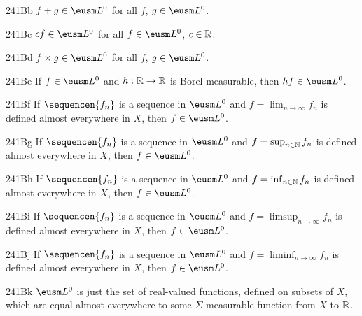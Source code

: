 \spheader 241Bb $f+g\in\eusm L^0$ for all $f$, $g\in\eusm L^0$.

\spheader 241Bc $cf\in\eusm L^0$ for all $f\in\eusm L^0$,
$c\in\Bbb R$.

\spheader 241Bd $f\times g\in\eusm L^0$ for all $f$,
$g\in\eusm L^0$.

\spheader 241Be If $f\in\eusm L^0$ and $h:\Bbb R\to\Bbb R$ is Borel measurable, then
$hf\in\eusm L^0$.

\spheader 241Bf If $\sequencen{f_n}$ is a sequence in $\eusm L^0$ and
$f=\lim_{n\to\infty}f_n$ is defined
almost everywhere in $X$, then $f\in\eusm L^0$.

\spheader 241Bg If $\sequencen{f_n}$ is a sequence in $\eusm L^0$ and
$f=\sup_{n\in\Bbb N}f_n$ is defined
almost everywhere in $X$, then $f\in\eusm L^0$.

\spheader 241Bh If $\sequencen{f_n}$ is a sequence in $\eusm L^0$ and
$f=\inf_{n\in\Bbb N}f_n$ is defined
almost everywhere in $X$, then $f\in\eusm L^0$.

\spheader 241Bi If $\sequencen{f_n}$ is a sequence in $\eusm L^0$ and
$f=\limsup_{n\to\infty}f_n$ is defined almost everywhere in $X$, then
$f\in\eusm L^0$.

\spheader 241Bj If $\sequencen{f_n}$ is a sequence in $\eusm L^0$ and
$f=\liminf_{n\to\infty}f_n$ is defined almost everywhere in $X$, then
$f\in\eusm L^0$.

\spheader 241Bk $\eusm L^0$ is just the set of real-valued functions, defined on
subsets of $X$, which are equal almost everywhere
to some $\Sigma$-measurable function from $X$ to $\Bbb R$.

